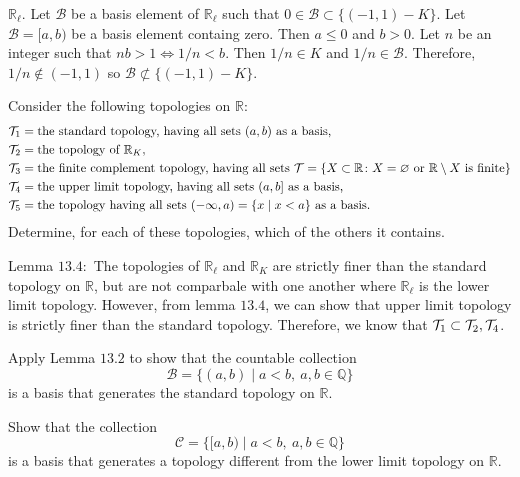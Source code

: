 \begin{exercise}
  \(\mathbb{R}_{\ell}\).
  Let \(\mathcal{B}\) be a basis element of \(\mathbb{R}_{\ell}\) such that
  \(0\in\mathcal{B}\subset\{(-1,1) - K\}\).
  Let \(\mathcal{B} = [a,b)\) be a basis element containg zero.
  Then \(a\leq 0\) and \(b > 0\).
  Let \(n\) be an integer such that \(nb > 1\iff 1/n < b\).
  Then \(1/n\in K\) and \(1/n\in\mathcal{B}\).
  Therefore, \(1/n\not\in (-1,1)\) so \(\mathcal{B}\not\subset\{(-1,1) - K\}\).
\item
  Consider the following topologies on \(\mathbb{R}\):
  \begin{align*}
    \mathcal{T}_1 & = \text{the standard topology, having all sets } (a, b)
             \text{ as a basis,}\\
    \mathcal{T}_2 & = \text{the topology of } \mathbb{R}_K,\\
    \mathcal{T}_3 & = \text{the finite complement topology, having all sets }
             \mathcal{T} = \{X\subset\mathbb{R}\colon X = \varnothing\text{ or }
             \mathbb{R}\setminus X\text{ is finite}\}\\
    \mathcal{T}_4 & = \text{the upper limit topology, having all sets } (a, b]
             \text{ as a basis,}\\
    \mathcal{T}_5 & = \text{the topology having all sets }
             (-\infty, a) = \{x\mid x < a\} \text{ as a basis.}
  \end{align*}
  Determine, for each of these topologies, which of the others it contains.
  \par\smallskip
  Lemma \(13.4\colon\) The topologies of \(\mathbb{R}_{\ell}\) and
  \(\mathbb{R}_K\) are strictly finer than the standard topology on
  \(\mathbb{R}\), but are not comparbale with one another where
  \(\mathbb{R}_{\ell}\) is the lower limit topology.
  However, from lemma \(13.4\), we can show that upper limit topology is
  strictly finer than the standard topology.
  Therefore, we know that \(\mathcal{T}_1\subset\mathcal{T}_2,\mathcal{T}_4\).
\item
  \begin{exercise}[label = (\alph*)]
  \item
    Apply Lemma \(13.2\) to show that the countable collection
    \[
    \mathcal{B} = \{(a, b)\mid a < b, \ a,b\in\mathbb{Q}\}
    \]
    is a basis that generates the standard topology on \(\mathbb{R}\).
  \item
    Show that the collection
    \[
    \mathcal{C} = \{[a, b)\mid a < b, \ a,b\in\mathbb{Q}\}
    \]
    is a basis that generates a topology different from the lower limit
    topology on \(\mathbb{R}\).
  \end{exercise}
\end{exercise}

